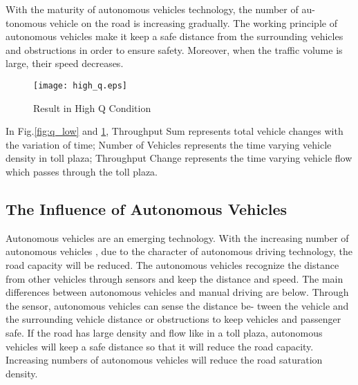 \documentclass{mcmthesis}
\begin{document}
With the maturity of autonomous vehicles technology, the number of au- tonomous vehicle on the road is increasing gradually. The working principle of autonomous vehicles make it keep a safe distance from the surrounding vehicles and obstructions in order to ensure  safety. Moreover, when the traffic volume is large, their speed decreases.
\begin{figure}[!htbp]
	\small
	\centering
	\texttt{[image: high\_q.eps]}
	\caption{\label{fig:q_high}Result in High Q Condition} 
\end{figure}

In Fig.\ref{fig:q_low} and \ref{fig:q_high}, Throughput Sum represents total vehicle changes with the variation of time; Number of Vehicles represents the time varying vehicle density in toll plaza; Throughput Change represents the time varying vehicle flow which passes through the toll plaza.
	


\subsection{The Influence of Autonomous Vehicles}
Autonomous vehicles are an emerging technology. With the increasing number of autonomous vehicles , due to the character of autonomous driving technology, the road capacity will be reduced.  The autonomous vehicles recognize the distance from other vehicles through sensors and keep the distance and speed. The main differences between autonomous vehicles and manual driving are below. Through the sensor, autonomous vehicles can sense the distance be- tween the vehicle and the surrounding vehicle distance or obstructions to keep vehicles and passenger safe. If the road has large density and flow like in a toll plaza, autonomous vehicles will keep a safe distance so that it will reduce the road capacity. Increasing numbers of autonomous vehicles will reduce the road saturation density.
\end{document}
